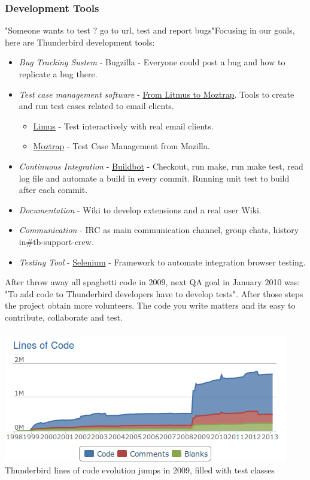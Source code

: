 \documentclass[11pt]{scrartcl}
\begin{document}
\subsubsection{Development Tools} "Someone wants to test ? go to url, test and report bugs"Focusing in our goals, here are Thunderbird development tools:
\begin{itemize}
	\item \textit{Bug Tracking Sustem} - Bugzilla - Everyone could post a bug and how to replicate a bug there.
	\item \textit{Test case management software} - \href{https://mail.mozilla.org/pipermail/thunderbird-testers/2012-October/000111.html}{From Litmus to Moztrap}. Tools to create and run test cases related to email clients.
\begin{itemize}
	\item \href{http://litmus.com/}{Limus} - Test interactively with real email clients.
	\item \href{http://moztrap.wordpress.com/}{Moztrap} - Test Case Management from Mozilla.
\end{itemize}
	\item \textit{Continuous Integration} - \href{http://trac.buildbot.net/}{Buildbot} - Checkout, run make, run make test, read log file and automate a build in every commit. Running unit test to build after each commit.
	\item \textit{Documentation} - Wiki to develop extensions and a real user Wiki.
	\item \textit{Communication} - IRC as main communication channel, group chats, history in\#tb-support-crew.
	\item \textit{Testing Tool} - \href{http://docs.seleniumhq.org/}{Selenium} - Framework to automate integration browser testing.
\end{itemize} After throw away all spaghetti code in 2009, next QA goal in January 2010 was: "To add code to Thunderbird developers have to develop tests". After those steps the project obtain more volunteers. The code you write matters and its easy to contribute, collaborate and test.
\\
\\
\href{http://1.bp.blogspot.com/-gUNRd0hUIDM/UVi9Z1fYssI/AAAAAAAAELE/YkUOcdIbMAY/s1600/thunderbird-code-evolution.png}{\includegraphics{thunderbird-code-evolution.png}}
Thunderbird lines of code evolution jumps in 2009, filled with test classes
\end{document}
